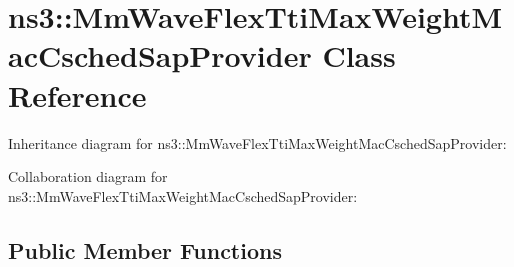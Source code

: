 \hypertarget{classns3_1_1MmWaveFlexTtiMaxWeightMacCschedSapProvider}{}\section{ns3\+:\+:Mm\+Wave\+Flex\+Tti\+Max\+Weight\+Mac\+Csched\+Sap\+Provider Class Reference}
\label{classns3_1_1MmWaveFlexTtiMaxWeightMacCschedSapProvider}


Inheritance diagram for ns3\+:\+:Mm\+Wave\+Flex\+Tti\+Max\+Weight\+Mac\+Csched\+Sap\+Provider\+:


Collaboration diagram for ns3\+:\+:Mm\+Wave\+Flex\+Tti\+Max\+Weight\+Mac\+Csched\+Sap\+Provider\+:
\subsection*{Public Member Functions}
